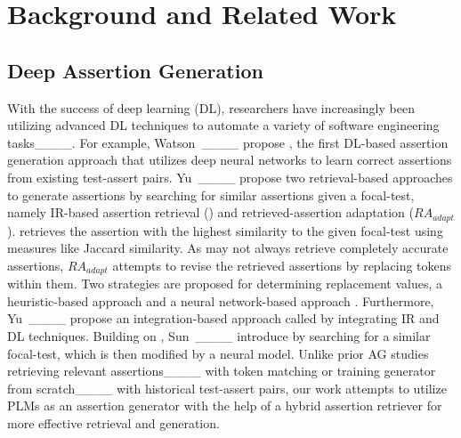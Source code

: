 \section{Background and Related Work}
\label{sec:background}
\subsection{Deep Assertion Generation}
\label{sec:background_AG}



With the success of deep learning (DL), researchers have increasingly been utilizing advanced DL techniques to automate a variety of software engineering tasks____.
For example, Watson~\etal____ propose \atla{}, the first DL-based assertion generation approach that utilizes deep neural networks to learn correct assertions from existing test-assert pairs.
Yu~\etal____ propose two retrieval-based approaches to generate assertions by searching for similar assertions given a focal-test, namely IR-based assertion retrieval (\irar{}) and retrieved-assertion adaptation ($RA_{adapt}$ ).
\irar{} retrieves the assertion with the highest similarity to the given focal-test using measures like Jaccard similarity.
As \irar{} may not always retrieve completely accurate assertions, $RA_{adapt}$ attempts to revise the retrieved assertions by replacing tokens within them.
Two strategies are proposed for determining replacement values, \ie a heuristic-based approach \rah{} and a neural network-based approach \rann{}.
Furthermore, Yu~\etal____ propose an integration-based approach called \inte{} by integrating IR and DL techniques.
Building on \inte{}, Sun~\etal____ introduce \edit{} by searching for a similar focal-test, which is then modified by a neural model.
Unlike prior AG studies retrieving relevant assertions____ with token matching or training generator from scratch____ with historical test-assert pairs, our work attempts to utilize PLMs as an assertion generator with the help of a hybrid assertion retriever for more effective retrieval and generation.

